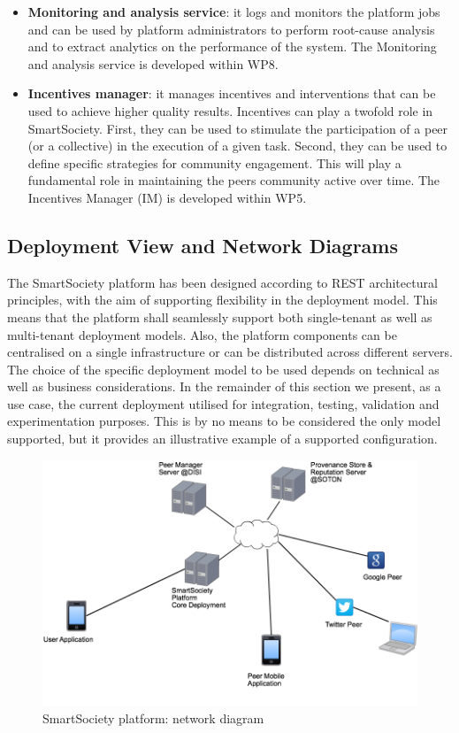 \begin{itemize}
\item {\bf Monitoring and analysis service}: it logs and monitors the platform jobs and can be used by platform administrators to perform root-cause analysis and to extract analytics on the performance of the system. The Monitoring and analysis service is developed within WP8.

\item {\bf Incentives manager}: it manages incentives and
interventions that can be used to achieve higher quality results. Incentives can play a twofold role in SmartSociety. First, they can be used to stimulate the participation of a peer (or a collective) in the execution of a given task. Second, they can be used to define specific strategies for community engagement. This will play a fundamental role in maintaining the peers community active over time. The Incentives Manager (IM) is developed within WP5.
\end{itemize} 	


\subsection{Deployment View and Network Diagrams}
The SmartSociety platform has been designed according to REST architectural principles, with the aim of supporting flexibility in the deployment model. This
means that the platform shall seamlessly support both single-tenant as
well as multi-tenant deployment models. Also, the platform components
can be centralised on a single infrastructure or can be distributed
across different servers. The choice of the specific deployment model
to be used depends on technical as well as business considerations. In
the remainder of this section we present, as a use case, the current
deployment utilised for integration, testing, validation and
experimentation purposes. This is by no means to be considered the
only model supported, but it provides an illustrative example of a
supported configuration. 

\begin{figure}[!hbt]
 \centering
 \includegraphics[width=1\textwidth]{figs/netDiagram}
 \caption{SmartSociety platform: network diagram}
 \label{fig:netDiagram}
\end{figure}

